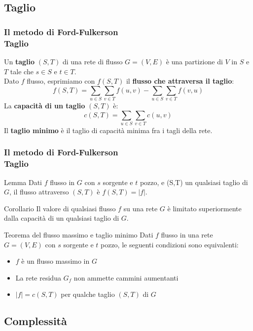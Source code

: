 \documentclass{beamer}
\begin{document}
\subsection{Taglio}

\begin{frame}
\frametitle{Il metodo di Ford-Fulkerson\\Taglio}
Un \textbf{taglio} $(S,T)$ di una rete di flusso $G=(V,E)$ è una partizione di $V$ in $S$ e $T$ tale che $s\in S$ e $t\in T$.\\
Dato $f$ flusso, esprimiamo con $f(S,T)$ il \textbf{flusso che attraversa il taglio}:
$$f(S,T)=\sum\limits_{u\in S}\sum\limits_{v\in T}f(u,v)-
         \sum\limits_{u\in S}\sum\limits_{v\in T}f(v,u)$$
La \textbf{capacità di un taglio} $(S,T)$ è:
$$c(S,T)=\sum\limits_{u\in S}\sum\limits_{v\in T}c(u,v)$$
Il \textbf{taglio minimo} è il taglio di capacità minima fra i tagli della rete.
\end{frame}

\begin{frame}
\frametitle{Il metodo di Ford-Fulkerson\\Taglio}
\begin{block}{Lemma}
Dati $f$ flusso in $G$ con $s$ sorgente e $t$ pozzo, e (S,T) un qualsiasi taglio di $G$, il flusso attraverso $(S,T)$ è $f(S,T)=|f|$.
\end{block}
\begin{block}{Corollario}
Il valore di qualsiasi flusso $f$ su una rete $G$ è limitato superiormente dalla capacità di un qualsiasi taglio di $G$.
\end{block}
\begin{block}{Teorema del flusso massimo e taglio minimo}
Dati $f$ flusso in una rete $G=(V,E)$ con $s$ sorgente e $t$ pozzo, le seguenti condizioni sono equivalenti:
\begin{itemize}
\item $f$ è un flusso massimo in $G$
\item La rete residua $G_f$ non ammette cammini aumentanti
\item $|f|=c(S,T)$ per qualche taglio $(S,T)$ di $G$
\end{itemize}
\end{block}
\end{frame}

\subsection{Complessità}
\end{document}
